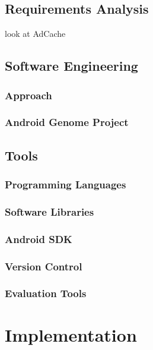 \documentclass[12pt,twoside,notitlepage]{report}
\begin{document}
\section{Requirements Analysis}
look at AdCache

\section{Software Engineering}

\subsection{Approach}

\subsection{Android Genome Project}

\section{Tools}

\subsection{Programming Languages}

\subsection{Software Libraries}

\subsection{Android SDK}

\subsection{Version Control}

\subsection{Evaluation Tools}

\cleardoublepage
\chapter{Implementation}
\end{document}
